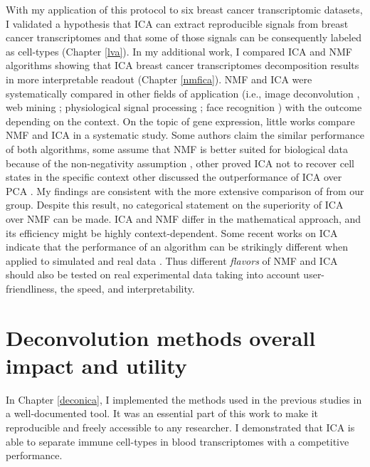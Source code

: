 \documentclass[12pt,]{book}
\theoremstyle{definition}
\theoremstyle{definition}
\theoremstyle{definition}
\theoremstyle{remark}
\begin{document}
With my application of this protocol to six breast cancer transcriptomic
datasets, I validated a hypothesis that ICA can extract reproducible
signals from breast cancer transcriptomes and that some of those signals
can be consequently labeled as cell-types (Chapter \ref{lva}). In my
additional work, I compared ICA and NMF algorithms showing that ICA
breast cancer transcriptomes decomposition results in more interpretable
readout (Chapter \ref{nmfica}). NMF and ICA were systematically compared
in other fields of application (i.e., image deconvolution
\citep{Mirzal2017}, web mining \citep{Chikhi2007}; physiological signal
processing \citep{Tresch2006}; face recognition \citep{Rajapakse2003})
with the outcome depending on the context. On the topic of gene
expression, little works compare NMF and ICA in a systematic study. Some
authors claim the similar performance of both
algorithms\citep{Kong2011, Schachtner2008}, some assume that NMF is
better suited for biological data because of the non-negativity
assumption \citep{Li2013}, other proved ICA not to recover cell states
in the specific context \citep{Sokol2015} other discussed the
outperformance of ICA over PCA \citep{Teschendorff2007}. My findings are
consistent with the more extensive comparison of \citet{Cantini2018}
from our group. Despite this result, no categorical statement on the
superiority of ICA over NMF can be made. ICA and NMF differ in the
mathematical approach, and its efficiency might be highly
context-dependent. Some recent works on ICA indicate that the
performance of an algorithm can be strikingly different when applied to
simulated and real data \citep{Ablin2018}. Thus different \emph{flavors}
of NMF and ICA should also be tested on real experimental data taking
into account user-friendliness, the speed, and interpretability.

\hypertarget{deconvolution-methods-overall-impact-and-utility}{%
\section{Deconvolution methods overall impact and
utility}\label{deconvolution-methods-overall-impact-and-utility}}

In Chapter \ref{deconica}, I implemented the methods used in the
previous studies in a well-documented tool. It was an essential part of
this work to make it reproducible and freely accessible to any
researcher. I demonstrated that ICA is able to separate immune
cell-types in blood transcriptomes with a competitive performance.
\end{document}
